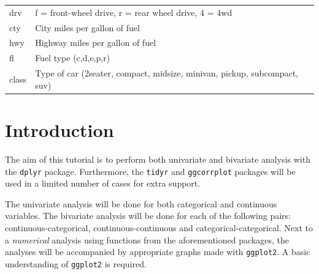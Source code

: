 \documentclass[]{tufte-book}
\begin{document}
\begin{longtable}[]{@{}ll@{}}
\begin{minipage}[t]{0.35\columnwidth}
drv\strut
\end{minipage} & \begin{minipage}[t]{0.59\columnwidth}\raggedright
f = front-wheel drive, r = rear wheel drive, 4 = 4wd\strut
\end{minipage}\tabularnewline
\begin{minipage}[t]{0.35\columnwidth}\raggedright
cty\strut
\end{minipage} & \begin{minipage}[t]{0.59\columnwidth}\raggedright
City miles per gallon of fuel\strut
\end{minipage}\tabularnewline
\begin{minipage}[t]{0.35\columnwidth}\raggedright
hwy\strut
\end{minipage} & \begin{minipage}[t]{0.59\columnwidth}\raggedright
Highway miles per gallon of fuel\strut
\end{minipage}\tabularnewline
\begin{minipage}[t]{0.35\columnwidth}\raggedright
fl\strut
\end{minipage} & \begin{minipage}[t]{0.59\columnwidth}\raggedright
Fuel type (c,d,e,p,r)\strut
\end{minipage}\tabularnewline
\begin{minipage}[t]{0.35\columnwidth}\raggedright
class\strut
\end{minipage} & \begin{minipage}[t]{0.59\columnwidth}\raggedright
Type of car (2seater, compact, midsize, minivan, pickup, subcompact, suv)\strut
\end{minipage}\tabularnewline
\bottomrule
\end{longtable}

\hypertarget{introduction}{%
\section{Introduction}\label{introduction}}

The aim of this tutorial is to perform both univariate and bivariate analysis with the \texttt{dplyr} package. Furthermore, the \texttt{tidyr} and \texttt{ggcorrplot} packages will be used in a limited number of cases for extra support.

The univariate analysis will be done for both categorical and continuous variables. The bivariate analysis will be done for each of the following pairs: continuous-categorical, continuous-continuous and categorical-categorical. Next to a \emph{numerical} analysis using functions from the aforementioned packages, the analyses will be accompanied by appropriate graphs made with \texttt{ggplot2}. A basic understanding of \texttt{ggplot2} is required.
\end{document}
